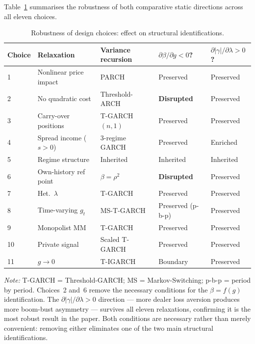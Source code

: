 \documentclass[12pt,a4paper]{article}
\theoremstyle{definition}
\begin{document}
\medskip\noindent
Table~\ref{tab:robustness_expanded} summarises the robustness of both
comparative static directions across all eleven choices.

\begin{table}[ht]
\centering
\caption{Robustness of design choices: effect on structural identifications.}
\label{tab:robustness_expanded}
\small
\begin{tabular}{p{0.8cm} p{2.8cm} p{2.4cm} p{2.4cm} p{2.3cm}}
\toprule
Choice & Relaxation & Variance recursion
& $\partial\beta/\partial g < 0$?
& $\partial|\gamma|/\partial\lambda > 0$? \\
\midrule
1 & Nonlinear price impact   & PARCH          & Preserved & Preserved \\
2 & No quadratic cost        & Threshold-ARCH & \textbf{Disrupted} & Preserved \\
3 & Carry-over positions     & T-GARCH$(n,1)$ & Preserved & Preserved \\
4 & Spread income ($s>0$)    & 3-regime GARCH & Preserved & Enriched \\
5 & Regime structure         & Inherited      & Inherited & Inherited \\
6 & Own-history ref point    & $\beta=\rho^2$ & \textbf{Disrupted} & Preserved \\
7 & Het.\ $\lambda$          & T-GARCH        & Preserved & Preserved \\
8 & Time-varying $g_t$       & MS-T-GARCH     & Preserved (p-b-p) & Preserved \\
9 & Monopolist MM            & T-GARCH        & Preserved & Preserved \\
10 & Private signal          & Scaled T-GARCH & Preserved & Preserved \\
11 & $g \to 0$               & T-IGARCH       & Boundary  & Preserved \\
\bottomrule
\end{tabular}
\medskip

\noindent\footnotesize{\textit{Note:} T-GARCH = Threshold-GARCH; MS = Markov-Switching;
p-b-p = period by period. Choices~2 and~6 remove the necessary conditions for
the $\beta = f(g)$ identification. The $\partial|\gamma|/\partial\lambda > 0$
direction --- more dealer loss aversion produces more boom-bust asymmetry ---
survives all eleven relaxations, confirming it is the most robust result in
the paper. Both conditions are necessary rather than merely convenient:
removing either eliminates one of the two main structural identifications.}
\end{table}
\end{document}
